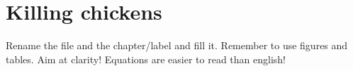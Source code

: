 
\ifx\isEmbedded\undefined

\graphicspath{{../img/}}

\fi

\chapter{Killing chickens}
\label{chap:killingchickens}

Rename the file and the chapter/label and fill it. Remember to use figures and tables. Aim at clarity! Equations are easier to read than english!

\ifx\isEmbedded\undefined


\pagebreak

\fi